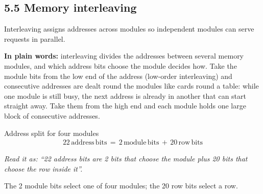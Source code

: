\documentclass[11pt]{article}
\begin{document}
\begin{keepsection}
\section{5.5 Memory interleaving}

Interleaving assigns addresses across modules so independent modules can serve requests in parallel.

\begin{plainbox}\textbf{In plain words:} interleaving divides the addresses between several memory modules, and which address bits choose the module decides how. Take the module bits from the low end of the address (low-order interleaving) and consecutive addresses are dealt round the modules like cards round a table: while one module is still busy, the next address is already in another that can start straight away. Take them from the high end and each module holds one large block of consecutive addresses.\end{plainbox}

\begin{equationcard}{Address split for four modules}
\[ \begin{gathered} 22\, \text{address}\, \text{bits}\, =\, 2\, \text{module}\, \text{bits}\, +\, 20\, \text{row}\, \text{bits} \end{gathered} \]
{\small \emph{Read it as: “22 address bits are 2 bits that choose the module plus 20 bits that choose the row inside it”.}\par The 2 module bits select one of four modules; the 20 row bits select a row.}
\end{equationcard}


\end{keepsection}
\end{document}
